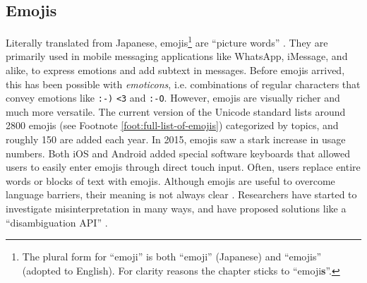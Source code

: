 \subsection{Emojis}
Literally translated from Japanese, emojis\footnote{The plural form for ``emoji'' is both ``emoji'' (Japanese) and ``emojis'' (adopted to English). For clarity reasons the chapter sticks to ``emoji\textbf{s}''.} are ``picture words'' \cite{Taggart2015NewWords}. They are primarily used in mobile messaging applications like WhatsApp, iMessage, and alike, to express emotions and add subtext in messages. Before emojis arrived, this has been possible with \textit{emoticons}, i.e. combinations of regular characters that convey emotions like \texttt{:-)} \texttt{<3} and \texttt{:-O}. However, emojis are visually richer and much more versatile. The current version of the Unicode standard lists around 2800 emojis (see Footnote \ref{foot:full-list-of-emojis}) categorized by topics, and roughly 150 are added each year. In 2015, emojis saw a stark increase in usage numbers. Both iOS and Android added special software keyboards that allowed users to easily enter emojis through direct touch input. %
Often, users replace entire words or blocks of text with emojis. Although emojis are useful to overcome language barriers, their meaning is not always clear \cite{Miller2015BlissfullyHappyEmoji,Tigwell2016EmojiMisunderstandings}. Researchers have started to investigate misinterpretation in many ways, and have proposed solutions like a ``disambiguation API'' \cite{Wijeratne2010}. 

